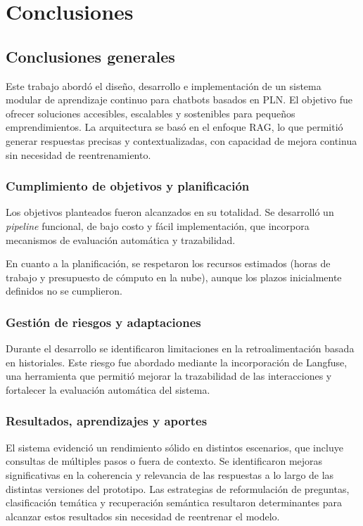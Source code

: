 \chapter{Conclusiones}
\label{Chapter5}

\section{Conclusiones generales}

Este trabajo abordó el diseño, desarrollo e implementación de un sistema modular de aprendizaje continuo para chatbots basados en PLN. El objetivo fue ofrecer soluciones accesibles, escalables y sostenibles para pequeños emprendimientos. La arquitectura se basó en el enfoque RAG, lo que permitió generar respuestas precisas y contextualizadas, con capacidad de mejora continua sin necesidad de reentrenamiento.

\subsection{Cumplimiento de objetivos y planificación}

Los objetivos planteados fueron alcanzados en su totalidad. Se desarrolló un \textit{pipeline} funcional, de bajo costo y fácil implementación, que incorpora mecanismos de evaluación automática y trazabilidad.

En cuanto a la planificación, se respetaron los recursos estimados (horas de trabajo y presupuesto de cómputo en la nube), aunque los plazos inicialmente definidos no se cumplieron.

\subsection{Gestión de riesgos y adaptaciones}

Durante el desarrollo se identificaron limitaciones en la retroalimentación basada en historiales. Este riesgo fue abordado mediante la incorporación de Langfuse, una herramienta que permitió mejorar la trazabilidad de las interacciones y fortalecer la evaluación automática del sistema.


\subsection{Resultados, aprendizajes y aportes}

El sistema evidenció un rendimiento sólido en distintos escenarios, que incluye consultas de múltiples pasos o fuera de contexto. Se identificaron mejoras significativas en la coherencia y relevancia de las respuestas a lo largo de las distintas versiones del prototipo. Las estrategias de reformulación de preguntas, clasificación temática y recuperación semántica resultaron determinantes para alcanzar estos resultados sin necesidad de reentrenar el modelo.

